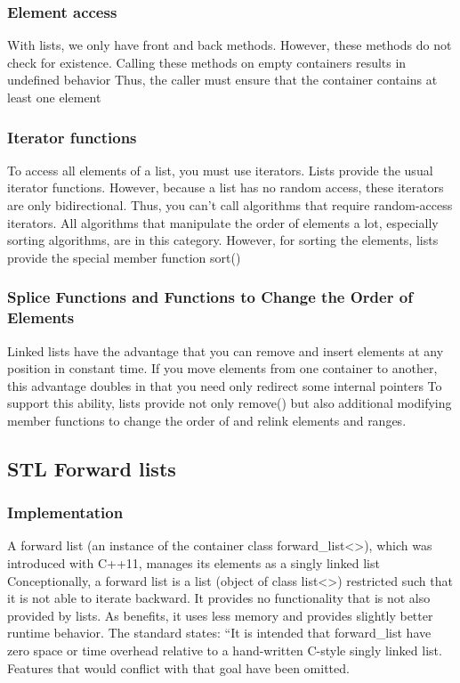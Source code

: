 \documentclass{report}
\begin{document}
\bigbreak \noindent 
\subsubsection{Element access}
\bigbreak \noindent 
With lists, we only have front and back methods. However, these methods do not check for existence. Calling these methods on empty containers results in undefined behavior
\bigbreak \noindent 
Thus, the caller must ensure that the container contains at least one element

\bigbreak \noindent 
\subsubsection{Iterator functions}
\bigbreak \noindent 
To access all elements of a list, you must use iterators. Lists provide the usual iterator functions. However, because a list has no random access, these iterators are only bidirectional.
Thus, you can’t call algorithms that require random-access iterators. All algorithms that manipulate
the order of elements a lot, especially sorting algorithms, are in this category. However, for sorting
the elements, lists provide the special member function sort()

\bigbreak \noindent 
\subsubsection{Splice Functions and Functions to Change the Order of Elements}
\bigbreak \noindent 
Linked lists have the advantage that you can remove and insert elements at any position in constant
time. If you move elements from one container to another, this advantage doubles in that you need
only redirect some internal pointers
\bigbreak \noindent 
To support this ability, lists provide not only remove() but also additional modifying member
functions to change the order of and relink elements and ranges.




   \pagebreak 
   \subsection{STL Forward lists}
   \bigbreak \noindent 
   \subsubsection{Implementation}
   \bigbreak \noindent 
   \bigbreak \noindent 
   A forward list (an instance of the container class forward\_list<>), which was introduced with C++11, manages its elements as a singly linked list
   \bigbreak \noindent 
   Conceptionally, a forward list is a list (object of class list<>) restricted such that it is not able to iterate backward. It provides no functionality that is not also provided by lists. As benefits, it uses less memory and provides slightly better runtime behavior. The standard states: “It is intended that forward\_list have zero space or time overhead relative to a hand-written C-style singly linked list. Features that would conflict with that goal have been omitted.
\end{document}
